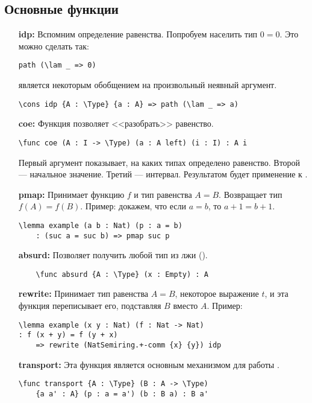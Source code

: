 \subsection{Основные функции}
\begin{itemize}
\item [\bf idp:] Вспомним определение равенства. Попробуем населить тип $0 = 0$. Это можно сделать так:

\begin{verbatim}
path (\lam _ => 0)
\end{verbatim}

 является некоторым обобщением на произвольный неявный аргумент.

\begin{verbatim}
\cons idp {A : \Type} {a : A} => path (\lam _ => a)
\end{verbatim}

\item [\bf coe:] Функция  позволяет <<разобрать>> равенство.

\begin{verbatim}
\func coe (A : I -> \Type) (a : A left) (i : I) : A i
\end{verbatim}

Первый аргумент показывает, на каких типах определено равенство. Второй --- начальное значение. Третий --- интервал.
Результатом будет применение  к .

\item [\bf pmap:] Принимает функцию $f$ и тип равенства $A = B$. Возвращает тип $f(A) = f(B)$.
Пример: докажем, что если $a = b$, то $a+1 = b+1$.
\begin{verbatim}
\lemma example (a b : Nat) (p : a = b) 
    : (suc a = suc b) => pmap suc p
\end{verbatim}

\item [\bf absurd:] Позволяет получить любой тип из лжи ().
\begin{verbatim}
    \func absurd {A : \Type} (x : Empty) : A
\end{verbatim}

\item [\bf rewrite:] Принимает тип равенства $A = B$, некоторое выражение $t$, и эта функция переписывает его, подставляя $B$ вместо $A$.
Пример:
\begin{verbatim}
\lemma example (x y : Nat) (f : Nat -> Nat)
: f (x + y) = f (y + x)
    => rewrite (NatSemiring.+-comm {x} {y}) idp
\end{verbatim}

\item [\bf transport:] Эта функция является основным механизмом для работы .
\begin{verbatim}
\func transport {A : \Type} (B : A -> \Type)
    {a a' : A} (p : a = a') (b : B a) : B a'
\end{verbatim}
\end{itemize}

